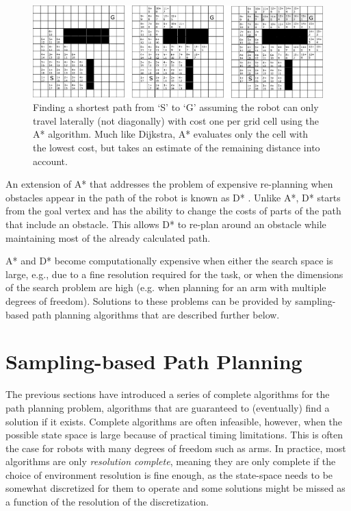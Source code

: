 
\begin{figure}[htb]
    \centering
    \includegraphics[width=\textwidth]{figs/astargrid.pdf}
    \caption{Finding a shortest path from `S' to `G' assuming the robot can only travel laterally (not diagonally) with cost one per grid cell using the A* algorithm. Much like Dijkstra, A* evaluates only the cell with the lowest cost, but takes an estimate of the remaining distance into account.\label{fig:astargrid}}
\end{figure}

An extension of A* that addresses the problem of expensive re-planning when obstacles appear in the path of the robot is known as D* \cite{stentz1994optimal}. Unlike A*, D* starts from the goal vertex and has the ability to change the costs of parts of the path that include an obstacle. This allows D* to re-plan around an obstacle while maintaining most of the already calculated path.

A* and D* become computationally expensive when either the search space is large, e.g., due to a fine resolution required for the task, or when the dimensions of the search problem are high (e.g. when planning for an arm with multiple degrees of freedom). Solutions to these problems can be provided by sampling-based path planning algorithms that are described further below.


\section{Sampling-based Path Planning}

The previous sections have introduced a series of complete algorithms for the path planning problem, algorithms that are guaranteed to (eventually) find a solution if it exists. Complete algorithms are often infeasible, however, when the possible state space is large because of practical timing limitations. This is often the case for robots with many degrees of freedom such as arms. In practice, most algorithms are only \textsl{resolution complete}, meaning they are only complete if the choice of environment resolution is fine enough, as the state-space needs to be somewhat discretized for them to operate and some solutions might be missed as a function of the resolution of the discretization.

